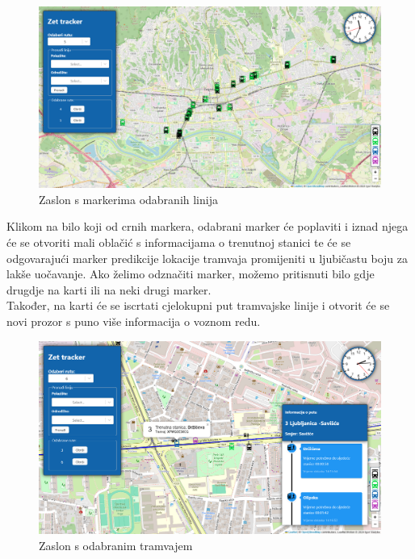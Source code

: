 \documentclass[zavrsnirad]{fer}
\begin{document}
\begin{figure}[H]
	\centering
	\includegraphics[width=\linewidth]{Figures/odabrantram.png} 
	\caption{Zaslon s markerima odabranih linija}
	\label{slk:zaslonmark}
\end{figure}
Klikom na bilo koji od crnih markera, odabrani marker će poplaviti i iznad njega će se otvoriti mali oblačić s informacijama o trenutnoj stanici te će se odgovarajući marker predikcije lokacije tramvaja promijeniti u ljubičastu boju za lakše uočavanje. Ako želimo odznačiti marker, možemo pritisnuti bilo gdje drugdje na karti ili na neki drugi marker.\\
Također, na karti će se iscrtati cjelokupni put tramvajske linije i otvorit će se novi prozor s puno više informacija o voznom redu.
\begin{figure}[H]
	\centering
	\includegraphics[width=\linewidth]{Figures/tram1.png} 
	\caption{Zaslon s odabranim tramvajem}
	\label{slk:tramodabran}
\end{figure}
\end{document}
